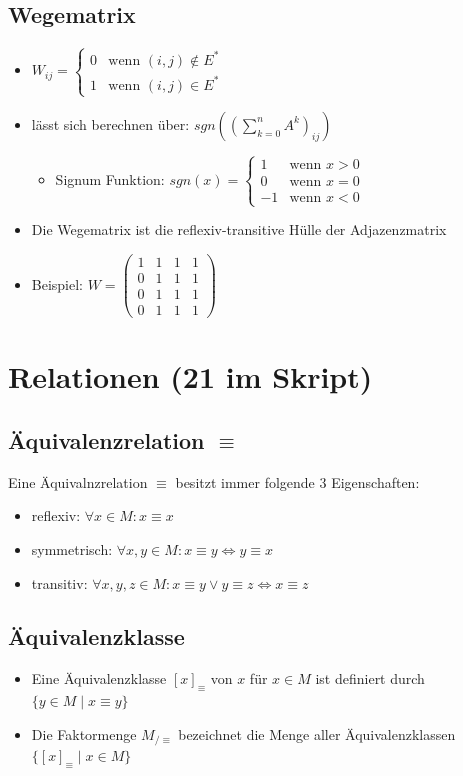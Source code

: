 \documentclass[a4paper,portrait]{scrartcl}
\begin{document}
\subsection{Wegematrix}
\begin{itemize}
\item
$W_{ij} = \begin{cases}
0&\text{wenn } (i,j) \notin E^{*}\\
1&\text{wenn } (i,j) \in E^{*}
\end{cases}$
\item lässt sich berechnen über: $sgn((\sum\limits_{k=0}^{n} A^{k})_{ij})$
  \begin{itemize}
  \item Signum Funktion: $sgn(x) = 
  \begin{cases}
  1 &\text{wenn } x>0 \\
  0 &\text{wenn } x=0 \\
  -1 &\text{wenn } x<0
  \end{cases}$
  \end{itemize}
\item Die Wegematrix ist die reflexiv-transitive Hülle der Adjazenzmatrix
\item Beispiel: 
$ W =
\begin{pmatrix}
1 & 1 & 1 & 1 \\
0 & 1 & 1 & 1 \\
0 & 1 & 1 & 1 \\
0 & 1 & 1 & 1
\end{pmatrix}
$ 
\end{itemize}
\section{Relationen (21 im Skript)}
\subsection{Äquivalenzrelation $\equiv$}
Eine Äquivalnzrelation $\equiv$ besitzt immer folgende 3 Eigenschaften:
\begin{itemize}
\item reflexiv: $ \forall x \in M: x \equiv x $
\item symmetrisch: $ \forall x,y \in M: x \equiv y \Leftrightarrow y \equiv x $
\item transitiv: $ \forall x,y,z \in M: x \equiv y \vee y \equiv z \Leftrightarrow x \equiv z $
\end{itemize}
\subsection{Äquivalenzklasse}
\begin{itemize}
\item Eine Äquivalenzklasse $[x]_\equiv $ von $x$ für $x \in M$ ist definiert durch \\
$ \lbrace y \in M \mid x \equiv y \rbrace $
\item Die Faktormenge $ M_{/ \equiv} $ bezeichnet die Menge aller Äquivalenzklassen \\
$ \lbrace [x]_{\equiv} \mid x \in M \rbrace $
\end{itemize}
\end{document}
